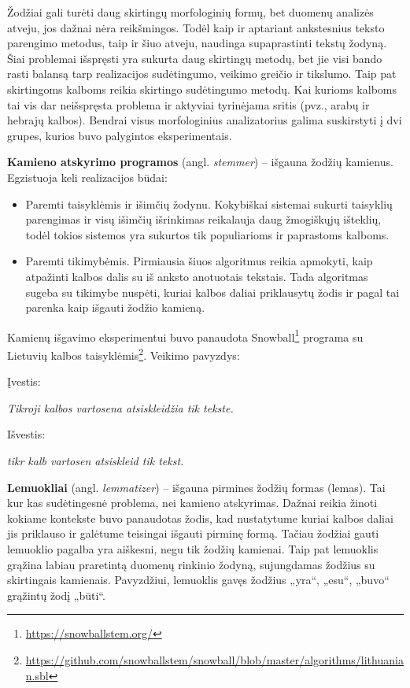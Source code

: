 \documentclass{VUMIFInfBakalaurinis}
\begin{document}
Žodžiai gali turėti daug skirtingų morfologinių formų, bet duomenų
analizės atveju, jos dažnai nėra reikšmingos. Todėl kaip ir aptariant
ankstesnius teksto parengimo metodus, taip ir šiuo atveju, naudinga
supaprastinti tekstų žodyną. Šiai problemai išspręsti yra sukurta daug
skirtingų metodų, bet jie visi bando rasti balansą tarp realizacijos
sudėtingumo, veikimo greičio ir tikslumo. Taip pat skirtingoms kalboms
reikia skirtingo sudėtingumo metodų. Kai kurioms kalboms tai vis dar
neišspręsta problema ir aktyviai tyrinėjama sritis (pvz., arabų ir
hebrajų kalbos). Bendrai visus morfologinius analizatorius galima
suskirstyti į dvi grupes, kurios buvo palygintos eksperimentais.


\textbf{Kamieno atskyrimo programos} (angl. \emph{stemmer}) -- išgauna
žodžių kamienus. Egzistuoja keli realizacijos būdai:

\begin{itemize}
\item
  Paremti taisyklėmis ir išimčių žodynu. Kokybiškai sistemai sukurti
  taisyklių parengimas ir visų išimčių išrinkimas reikalauja daug
  žmogiškųjų išteklių, todėl tokios sistemos yra sukurtos tik
  populiarioms ir paprastoms kalboms.
\item
  Paremti tikimybėmis. Pirmiausia šiuos algoritmus reikia apmokyti, kaip
  atpažinti kalbos dalis su iš anksto anotuotais tekstais. Tada
  algoritmas sugeba su tikimybe nuspėti, kuriai kalbos daliai priklausytų
  žodis ir pagal tai parenka kaip išgauti žodžio kamieną.
\end{itemize}

Kamienų išgavimo eksperimentui buvo panaudota Snowball\footnote{\url{https://snowballstem.org/}}
programa su Lietuvių kalbos taisyklėmis\footnote{\url{https://github.com/snowballstem/snowball/blob/master/algorithms/lithuanian.sbl}}.
Veikimo pavyzdys:

Įvestis:

\emph{Tikroji kalbos vartosena atsiskleidžia tik tekste.}

Išvestis:

\emph{tikr kalb vartosen atsiskleid tik tekst.}


\textbf{Lemuokliai} (angl. \emph{lemmatizer}) -- išgauna pirmines žodžių
formas (lemas). Tai kur kas sudėtingesnė problema, nei kamieno
atskyrimas. Dažnai reikia žinoti kokiame kontekste buvo panaudotas
žodis, kad nustatytume kuriai kalbos daliai jis priklauso ir galėtume
teisingai išgauti pirminę formą. Tačiau žodžiai gauti lemuoklio pagalba
yra aiškesni, negu tik žodžių kamienai. Taip pat lemuoklis grąžina
labiau praretintą duomenų rinkinio žodyną, sujungdamas žodžius su
skirtingais kamienais. Pavyzdžiui, lemuoklis gavęs žodžius „yra“,
„esu“, „buvo“ grąžintų žodį „būti“.
\end{document}
